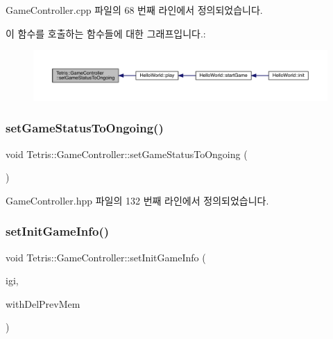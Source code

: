 Game\+Controller.\+cpp 파일의 68 번째 라인에서 정의되었습니다.

이 함수를 호출하는 함수들에 대한 그래프입니다.\+:
\nopagebreak
\begin{figure}[H]
\begin{center}
\leavevmode
\includegraphics[width=350pt]{class_tetris_1_1_game_controller_a47681985e6fbf14411a70be08f85bf99_icgraph}
\end{center}
\end{figure}
\mbox{\label{class_tetris_1_1_game_controller_a47681985e6fbf14411a70be08f85bf99}} 
\subsubsection{\texorpdfstring{set\+Game\+Status\+To\+Ongoing()}{setGameStatusToOngoing()}\hspace{0.1cm}{\footnotesize\ttfamily [2/2]}}
{\footnotesize\ttfamily void Tetris\+::\+Game\+Controller\+::set\+Game\+Status\+To\+Ongoing (\begin{DoxyParamCaption}{ }\end{DoxyParamCaption})\hspace{0.3cm}{\ttfamily [inline]}}



Game\+Controller.\+hpp 파일의 132 번째 라인에서 정의되었습니다.

\mbox{\label{class_tetris_1_1_game_controller_a0d835f535b48529ca536115dd8123099}} 
\subsubsection{\texorpdfstring{set\+Init\+Game\+Info()}{setInitGameInfo()}\hspace{0.1cm}{\footnotesize\ttfamily [1/2]}}
{\footnotesize\ttfamily void Tetris\+::\+Game\+Controller\+::set\+Init\+Game\+Info (\begin{DoxyParamCaption}\item[{\hyperlink{class_tetris_1_1_init_game_info}{Init\+Game\+Info} $\ast$}]{igi,  }\item[{bool}]{with\+Del\+Prev\+Mem }\end{DoxyParamCaption})}



